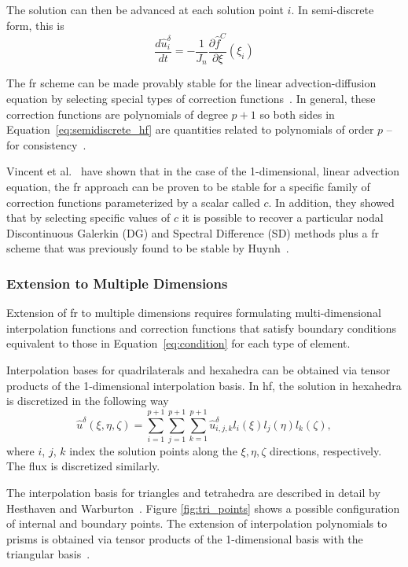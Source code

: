 The solution can then be advanced at each solution point $i$. In semi-discrete form, this is
\begin{equation}\label{eq:semidiscrete_hf}
\frac{d \hat{u}_i^\delta}{d t} = - \frac{1}{J_n}\frac{\partial \hat{f}^C}{\partial \xi}(\xi_i)
\end{equation}

The \gls{fr} scheme can be made provably stable for the linear advection-diffusion equation by selecting special types of correction functions~\cite{castonguay2013energy}. In general, these correction functions are polynomials of degree $p+1$ so both sides in Equation~\eqref{eq:semidiscrete_hf} are quantities related to polynomials of order $p$ --for consistency~\cite{huynh2007flux}.

Vincent et al.~\cite{vincent2011new} have shown that in the case of the 1-dimensional, linear advection equation, the \gls{fr} approach can be proven to be stable for a specific family of correction functions parameterized by a scalar called $c$. In addition, they showed that by selecting specific values of $c$ it is possible to recover a particular nodal Discontinuous Galerkin (DG) and Spectral Difference (SD) methods plus a \gls{fr} scheme that was previously found to be stable by Huynh~\cite{huynh2007flux}.

\subsubsection{Extension to Multiple Dimensions}

Extension of \gls{fr} to multiple dimensions requires formulating multi-dimensional interpolation functions and correction functions that satisfy boundary conditions equivalent to those in Equation~\eqref{eq:condition} for each type of element.

Interpolation bases for quadrilaterals and hexahedra can be obtained via tensor products of the 1-dimensional interpolation basis. In \gls{hf}, the solution in hexahedra is discretized in the following way
\begin{equation}
{\hat{u}}^\delta(\xi,\eta,\zeta) = \sum_{i=1}^{p+1} \sum_{j=1}^{p+1} \sum_{k=1}^{p+1}
{\hat{u}}^\delta_{i,j,k} l_i(\xi) l_j(\eta) l_k(\zeta),
\end{equation}
where $i$, $j$, $k$ index the solution points along the $\xi, \eta, \zeta$ directions, respectively. The flux is discretized similarly.

The interpolation basis for triangles and tetrahedra are described in detail by Hesthaven and Warburton~\cite{hesthaven2007nodal}. Figure \ref{fig:tri_points} shows a possible configuration of internal and boundary points. The extension of interpolation polynomials to prisms is obtained via tensor products of the 1-dimensional basis with the triangular basis~\cite{castonguay2011}. 

